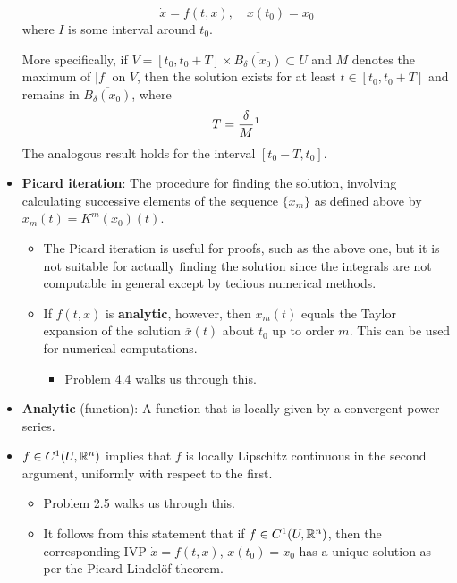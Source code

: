 \documentclass[../notes.tex]{subfiles}
\begin{document}
\begin{itemize}
    \begin{equation*}
        \dot{x} = f(t,x)
        ,\quad
        x(t_0) = x_0
    \end{equation*}
    where $I$ is some interval around $t_0$.\par
    More specifically, if $V=[t_0,t_0+T]\times\overline{B_\delta(x_0)}\subset U$ and $M$ denotes the maximum of $|f|$ on $V$, then the solution exists for at least $t\in[t_0,t_0+T]$ and remains in $\overline{B_\delta(x_0)}$, where
    \begin{equation*}
        T = \frac{\delta}{M}\footnotemark
    \end{equation*}
    The analogous result holds for the interval $[t_0-T,t_0]$.
    \item \textbf{Picard iteration}: The procedure for finding the solution, involving calculating successive elements of the sequence $\{x_m\}$ as defined above by $x_m(t)=K^m(x_0)(t)$.
    \begin{itemize}
        \item The Picard iteration is useful for proofs, such as the above one, but it is not suitable for actually finding the solution since the integrals are not computable in general except by tedious numerical methods.
        \item If $f(t,x)$ is \textbf{analytic}, however, then $x_m(t)$ equals the Taylor expansion of the solution $\bar{x}(t)$ about $t_0$ up to order $m$. This can be used for numerical computations.
        \begin{itemize}
            \item Problem 4.4 walks us through this.
        \end{itemize}
    \end{itemize}
    \item \textbf{Analytic} (function): A function that is locally given by a convergent power series.
    \item $f\in C^1(U,\mathbb{R}^n)$ implies that $f$ is locally Lipschitz continuous in the second argument, uniformly with respect to the first.
    \begin{itemize}
        \item Problem 2.5 walks us through this.
        \item It follows from this statement that if $f\in C^1(U,\mathbb{R}^n)$, then the corresponding IVP $\dot{x}=f(t,x)$, $x(t_0)=x_0$ has a unique solution as per the Picard-Lindel\"{o}f theorem.

\end{itemize}
\end{itemize}
\end{document}
